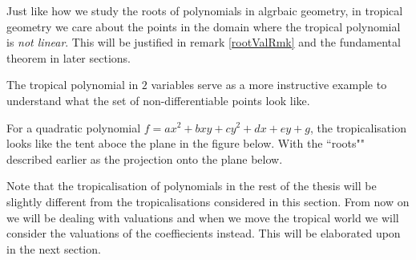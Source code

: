 \par Just like how we study the roots of polynomials in algrbaic geometry, in tropical geometry we care about the points in the domain where the tropical polynomial is \textit{not linear}.
This will be justified in remark \ref{rootValRmk} and the fundamental theorem in later sections.
\par The tropical polynomial in $2$ variables serve as a more instructive example to understand what the set of non-differentiable points look like. 

\begin{example}
    For a quadratic polynomial $f = ax^{2} + bxy + cy^{2} + dx + ey + g$, the tropicalisation looks like the tent aboce the plane in the figure below. 
    With the ``roots"" described earlier as the projection onto the plane below.
    \begin{figure}[ht]
        \centering
    \end{figure}
\end{example}

\begin{remark}
    \label{rmkOnTropPol}
    Note that the tropicalisation of polynomials in the rest of the thesis will be slightly different from the tropicalisations considered in this section.
    From now on we will be dealing with valuations and when we move the tropical world we will consider the valuations of the coeffiecients instead. 
    This will be elaborated upon in the next section.
\end{remark}

